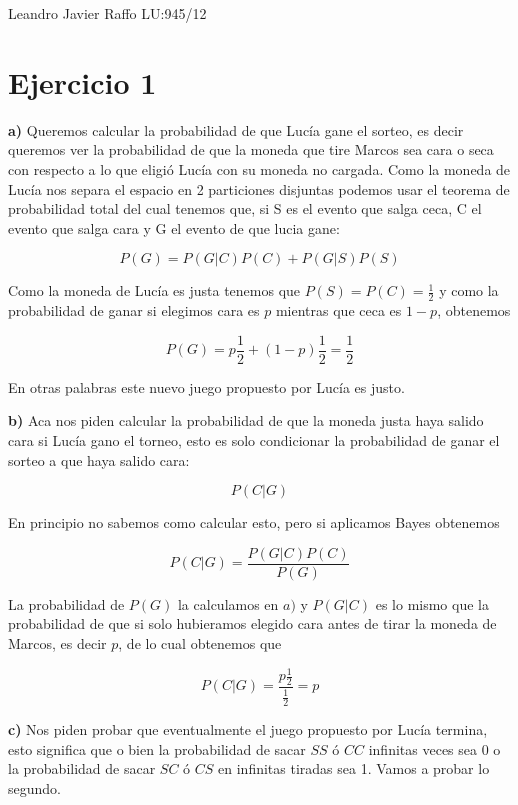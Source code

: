 \documentclass[leqno, 12pt, twoside, letterpaper]{book}
\date{\vspace{-5ex}}
\begin{document}
\bigskip

\centerline {Leandro Javier Raffo LU:945/12}


\hfill\newline

\section*{Ejercicio 1}

\noindent\textbf{a)} Queremos calcular la probabilidad de que Lucía gane el sorteo, es decir
queremos ver la probabilidad de que la moneda que tire Marcos sea cara o seca
con respecto a lo que eligió Lucía con su moneda no cargada. Como la moneda de
Lucía nos separa el espacio en 2 particiones disjuntas podemos usar el teorema
de probabilidad total del cual tenemos que, si S es el evento que salga ceca, C
el evento que salga cara y G el evento de que lucia gane:

$$P(G) = P(G|C)P(C) + P(G|S)P(S)$$

Como la moneda de Lucía es justa tenemos que $P(S) = P(C) = \tfrac{1}{2}$ y como
la probabilidad de ganar si elegimos cara es $p$ mientras que ceca es $1 - p$,
obtenemos

$$P(G) = p \frac{1}{2} + (1 -p) \frac{1}{2} = \frac{1}{2}$$

En otras palabras este nuevo juego propuesto por Lucía es justo.

\hfill
\newline

\noindent\textbf{b)} Aca nos piden calcular la probabilidad de que la moneda justa haya salido
cara si Lucía gano el torneo, esto es solo condicionar la probabilidad de ganar
el sorteo a que haya salido cara:

$$P(C|G)$$

En principio no sabemos como calcular esto, pero si aplicamos Bayes obtenemos

$$P(C|G) = \dfrac{P(G|C) P(C)}{P(G)}$$

La probabilidad de $P(G)$ la calculamos en $a)$ y $P(G|C)$ es lo mismo que la
probabilidad de que si solo hubieramos elegido cara antes de tirar la moneda de
Marcos, es decir $p$, de lo cual obtenemos que

$$P(C|G) = \dfrac{p \tfrac{1}{2}}{\tfrac{1}{2}} = p$$

\hfill
\newline

\noindent\textbf{c)} Nos piden probar que eventualmente el juego propuesto por
Lucía termina, esto significa que o bien la probabilidad de sacar $SS$ ó $CC$
infinitas veces sea $0$ o la probabilidad de sacar $SC$ ó $CS$ en infinitas
tiradas sea 1. Vamos a probar lo segundo.
\end{document}

